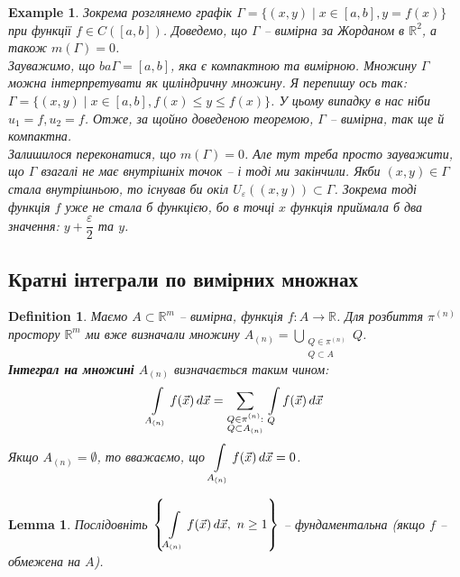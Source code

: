 \documentclass[a4paper, 10pt]{article}
\theoremstyle{theoremdd}
\theoremstyle{theoremdd}
\newtheorem{definition}[theorem]{Definition}
\theoremstyle{theoremdd}
\theoremstyle{theoremdd}
\newtheorem{example}[theorem]{Example}
\theoremstyle{theoremdd}
\theoremstyle{theoremdd}
\theoremstyle{theoremdd}
\newtheorem{lemma}[theorem]{Lemma}
\theoremstyle{theoremdd}
\begin{document}
\begin{example}
Зокрема розглянемо графік $\Gamma = \{(x,y) \mid x \in [a,b], y = f(x)\}$ при функції $f \in C([a,b])$. Доведемо, що $\Gamma$ -- вимірна за Жорданом в $\mathbb{R}^2$, а також $m(\Gamma) = 0$.\\
Зауважимо, що $ba \Gamma = [a,b]$, яка є компактною та вимірною. Множину $\Gamma$ можна інтерпретувати як циліндричну множину. Я перепишу ось так: $\Gamma = \{(x,y) \mid x \in [a,b], f(x) \leq y \leq f(x)\}$. У цьому випадку в нас ніби $u_1 = f, u_2 = f$. Отже, за щойно доведеною теоремою, $\Gamma$ -- вимірна, так ще й компактна. \\
Залишилося переконатися, що $m(\Gamma) = 0$. Але тут треба просто зауважити, що $\Gamma$ взагалі не має внутрішніх точок -- і тоді ми закінчили. Якби $(x,y) \in \Gamma$ стала внутрішньою, то існував би окіл $U_{\varepsilon}((x,y)) \subset \Gamma$. Зокрема тоді функція $f$ уже не стала б функцією, бо в точці $x$ функція приймала б два значення: $y + \dfrac{\varepsilon}{2}$ та $y$.
\end{example}

\subsection{Кратні інтеграли по вимірних множнах}
\begin{definition}
Маємо $A \subset \mathbb{R}^m$ -- вимірна, функція $f \colon A \to \mathbb{R}$. Для розбиття $\pi^{(n)}$ простору $\mathbb{R}^m$ ми вже визначали множину $A_{(n)} = \displaystyle\bigcup_{\substack{Q \in \pi^{(n)} \\ Q \subset A}} Q$.\\
\textbf{Інтеграл на множині} $A_{(n)}$ визначається таким чином:
\begin{align*}
\int\displaylimits_{A_{(n)}} f(\vec{x})\,d\vec{x} = \sum_{\substack{Q \in \pi^{(n)}: \\ Q \subset A_{{(n)}}}}\, \int\displaylimits_Q f(\vec{x})\,d\vec{x}
\end{align*}
Якщо $A_{(n)} = \emptyset$, то вважаємо, що $\displaystyle\int\displaylimits_{A_{(n)}} f(\vec{x})\,d\vec{x} = 0$.
\end{definition}

\begin{lemma}
Послідовніть $\displaystyle\left\{ \int\displaylimits_{A_{(n)}} f(\vec{x})\,d\vec{x},\ n \geq 1 \right\}$ -- фундаментальна (якщо $f$ -- обмежена на $A$).
\end{lemma}
\end{document}
